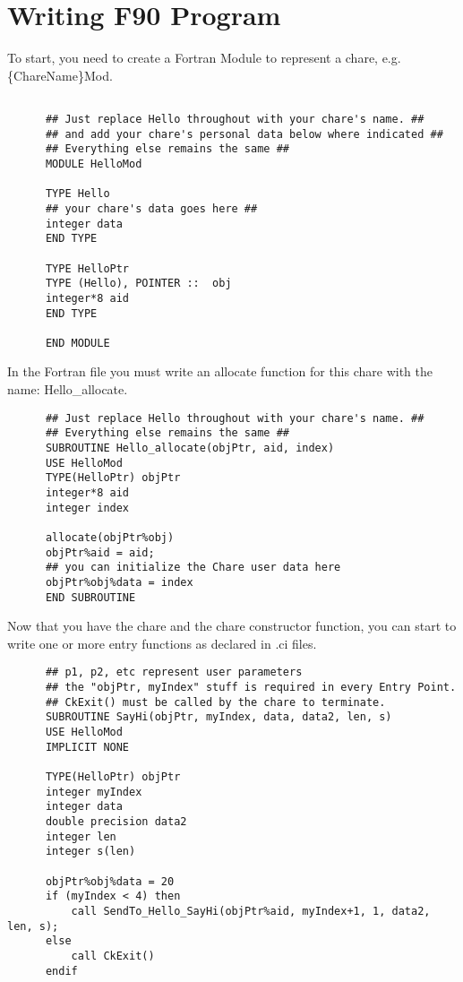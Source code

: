 \documentclass[11pt]{article}
\begin{document}
\section{Writing F90 Program}
To start, you need to create a Fortran Module to represent a chare,
e.g. \{ChareName\}Mod.

\begin{verbatim}

      ## Just replace Hello throughout with your chare's name. ##
      ## and add your chare's personal data below where indicated ##
      ## Everything else remains the same ##
      MODULE HelloMod

      TYPE Hello
      ## your chare's data goes here ##
      integer data
      END TYPE

      TYPE HelloPtr
      TYPE (Hello), POINTER ::  obj
      integer*8 aid
      END TYPE

      END MODULE
\end{verbatim}

In the Fortran file you must write an allocate function for this chare
with the name: Hello\_allocate.

\begin{verbatim}
      ## Just replace Hello throughout with your chare's name. ##
      ## Everything else remains the same ##
      SUBROUTINE Hello_allocate(objPtr, aid, index)
      USE HelloMod
      TYPE(HelloPtr) objPtr 
      integer*8 aid
      integer index

      allocate(objPtr%obj)
      objPtr%aid = aid;
      ## you can initialize the Chare user data here
      objPtr%obj%data = index
      END SUBROUTINE
\end{verbatim}

Now that you have the chare and the chare constructor function, you can start
 to write one or more entry functions as declared in .ci files.
\begin{verbatim}
      ## p1, p2, etc represent user parameters
      ## the "objPtr, myIndex" stuff is required in every Entry Point.
      ## CkExit() must be called by the chare to terminate.
      SUBROUTINE SayHi(objPtr, myIndex, data, data2, len, s)
      USE HelloMod
      IMPLICIT NONE

      TYPE(HelloPtr) objPtr
      integer myIndex
      integer data
      double precision data2
      integer len
      integer s(len)

      objPtr%obj%data = 20
      if (myIndex < 4) then
          call SendTo_Hello_SayHi(objPtr%aid, myIndex+1, 1, data2, len, s);
      else 
          call CkExit()
      endif
\end{verbatim}
\end{document}
